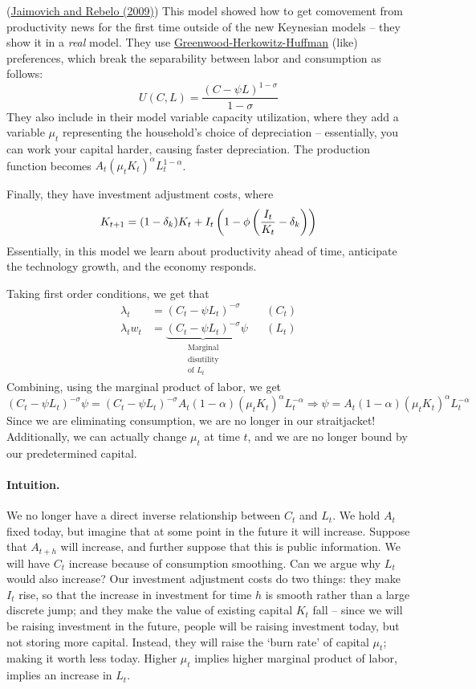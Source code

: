 \documentclass[10pt]{article}
\begin{document}
\begin{model}
	 (\href{https://www.aeaweb.org/articles?id=10.1257/aer.99.4.1097}{Jaimovich and Rebelo (2009)}) This model showed how to get comovement from productivity news for the first time outside of the new Keynesian models -- they show it in a \emph{real} model. They use \href{https://www.jeremygreenwood.net/papers/ghh88.pdf}{Greenwood-Herkowitz-Huffman} (like) preferences, which break the separability between labor and consumption as follows:
\[
U(C,L) = \frac{(C - \psi L)^{1-\sigma}}{1-\sigma}
\]
They also include in their model variable capacity utilization, where they add a variable $\mu_t$ representing the household's choice of depreciation -- essentially, you can work your capital harder, causing faster depreciation. The production function becomes $A_t (\mu_tK_t)^\alpha L_t^{1-\alpha}$.

Finally, they have investment adjustment costs, where
\[
K_{t+1} = (1-\delta_k)K_t + I_t\left( 1 - \phi\left( \frac{I_t}{K_t} - \delta_k\right) \right)
\]
Essentially, in this model we learn about productivity ahead of time, anticipate the technology growth, and the economy responds. 

Taking first order conditions, we get that
\begin{align*}
	\lambda_t &= (C_t - \psi L_t)^{-\sigma} &&(C_t) \\
	\lambda_t w_t &= \underbrace{(C_t - \psi L_t)^{-\sigma}}_{\substack{\text{Marginal} \\ \text{disutility} \\ \text{of } L_t}}\psi &&(L_t)
\end{align*}
Combining, using the marginal product of labor, we get
\[
(C_t-\psi L_t)^{-\sigma} \psi = (C_t - \psi L_t)^{-\sigma} A_t (1-\alpha) (\mu_t K_t)^\alpha L_t^{-\alpha} \Longrightarrow \psi =  A_t (1-\alpha) (\mu_t K_t)^\alpha L_t^{-\alpha}
\]
Since we are eliminating consumption, we are no longer in our straitjacket! Additionally, we can actually change $\mu_t$ at time $t$, and we are no longer bound by our predetermined capital.
\end{model}

\paragraph{Intuition.} We no longer have a direct inverse relationship between $C_t$ and $L_t$. We hold $A_t$ fixed today, but imagine that at some point in the future it will increase. Suppose that $A_{t+h}$ will increase, and further suppose that this is public information. We will have $C_t$ increase because of consumption smoothing. Can we argue why $L_t$ would also increase? Our investment adjustment costs do two things: they make $I_t$ rise, so that the increase in investment for time $h$ is smooth rather than a large discrete jump; and they make the value of existing capital $K_t$ fall -- since we will be raising investment in the future, people will be raising investment today, but not storing more capital. Instead, they will raise the `burn rate' of capital $\mu_t$; making it worth less today. Higher $\mu_t$ implies higher marginal product of labor, implies an increase in $L_t$.
\end{document}
